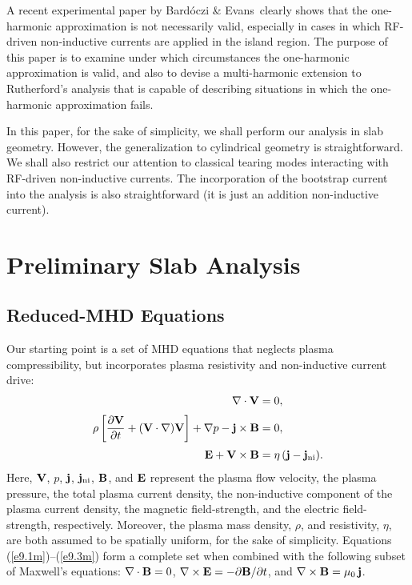 \documentclass[12pt,prb,aps]{revtex4-1}
\begin{document}
A recent experimental paper by Bard\'{o}czi \& Evans\,\cite{bar} clearly shows that the one-harmonic
approximation is not necessarily valid, especially in cases in which RF-driven non-inductive
currents  are applied in the island region. 
The purpose of this paper is to examine under which circumstances the one-harmonic approximation is valid, and
also to devise a multi-harmonic extension to Rutherford's analysis that is capable of  describing situations in 
which the one-harmonic approximation fails. 

In this paper, for the sake of simplicity, we shall perform our analysis
in slab geometry. However, the generalization to cylindrical geometry is straightforward. We shall also restrict our attention to classical tearing modes interacting with RF-driven non-inductive currents. The incorporation of the
bootstrap current into the analysis is also straightforward (it is just an addition non-inductive current). 

\section{Preliminary Slab Analysis}
\subsection{Reduced-MHD Equations}
Our starting point is a set of MHD equations that neglects plasma compressibility,
but incorporates  plasma resistivity and non-inductive current drive: 
\begin{align}
\nabla\cdot{\bf V} &= 0,\label{e9.1m}\\[0.5ex]
\rho\left[\frac{\partial {\bf V}}{\partial t} + ({\bf V}\cdot\nabla) {\bf V}\right]+\nabla p-{\bf j}\times {\bf B} &=0,\label{e9.2m}\\[0,5ex]
{\bf E} + {\bf V} \times {\bf B} &=\eta\,({\bf j}-{\bf j}_{\rm ni}).\label{e9.3m}
\end{align}
Here, ${\bf V}$, $p$,   ${\bf j}$, ${\bf j}_{\rm ni}$, ${\bf B}$,  and ${\bf E}$  represent the plasma flow velocity, the plasma
pressure, the total plasma current density, 
the non-inductive component of the plasma current density, the magnetic field-strength, and the electric field-strength, respectively.  Moreover, the plasma mass density, $\rho$, and resistivity, $\eta$, are both assumed to be spatially uniform, for the sake of simplicity.  
Equations (\ref{e9.1m})--(\ref{e9.3m})  form a complete set when combined with the following subset of 
Maxwell's equations:
$\nabla\cdot{\bf B} =0$,
$ \nabla\times {\bf E}=-\partial{\bf B}/\partial t$, and $\nabla\times {\bf B} = \mu_0\,{\bf j}$.
 
\end{document}
